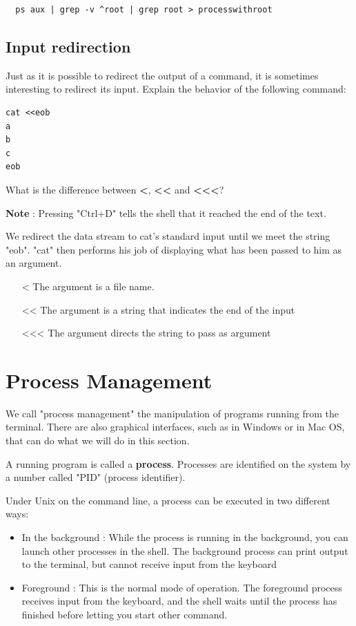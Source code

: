 \documentclass[11pt]{article}
\begin{document}
\begin{solution}
 \begin{verbatim}
  ps aux | grep -v ^root | grep root > processwithroot
 \end{verbatim}
\end{solution}

\subsection{Input redirection}
Just as it is possible to redirect the output of a command, it is sometimes interesting to redirect its input. Explain the behavior of the following command:

\begin{lstlisting}
cat <<eob
a
b
c
eob
\end{lstlisting}
What is the difference between \textbf{<{}}, \textbf{<{}<{}} and \textbf{<{}<{}<{}}?

\textbf{Note} : Pressing "Ctrl+D" tells the shell that it reached the end of the text.


\begin{solution}
  We redirect the data stream to cat's standard input until we meet the string "eob". "cat" then performs his job of displaying what has been passed to him as an argument.
  \begin{itemize}
  \item[<] The argument is a file name.
  \item[<{}<{}] The argument is a string that indicates the end of the input
  \item[<{}<{}<{}] The argument directs the string to pass as argument
  \end{itemize}
\end{solution}

\section{Process Management}
We call "process management" the manipulation of programs running from the terminal. There are also graphical interfaces, such as in Windows or in Mac OS, that can do what we will do in this section.

A running program is called a \textbf{process}. Processes are identified on the system by a number called "PID" (process identifier).

Under Unix on the command line, a process can be executed in two different ways:


\begin{itemize}
 \item In the background : While the process is running in the background, you can launch other processes
in the shell. The background process can print output to the terminal, but cannot receive input from
the keyboard
\item Foreground : This is the normal mode of operation. The foreground process receives input from the
keyboard, and the shell waits until the process has finished before letting you start other command.
 
\end{itemize}
\end{document}
